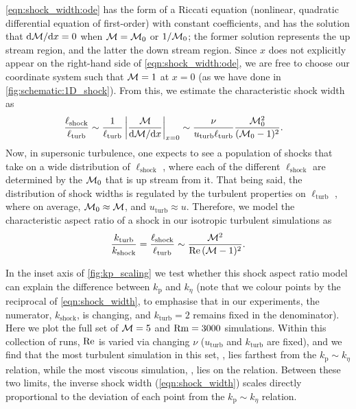 \autoref{eqn:shock_width:ode} has the form of a Riccati equation (nonlinear, quadratic differential equation of first-order) with constant coefficients, and has the solution that $\mathrm{d} \mathcal{M}/\mathrm{d} x = 0$ when $\mathcal{M} = \mathcal{M}_0$ or $1/\mathcal{M}_0$; the former solution represents the up stream region, and the latter the down stream region. Since $x$ does not explicitly appear on the right-hand side of \autoref{eqn:shock_width:ode}, we are free to choose our coordinate system such that $\mathcal{M} = 1$ at $x=0$ (as we have done in \autoref{fig:schematic:1D_shock}). From this, we estimate the characteristic shock width as
\begin{align}
    \frac{\ell_\mathrm{shock}}{\ell_\mathrm{turb}}
        &\sim \frac{1}{\ell_\mathrm{turb}} \left|
                \frac{\mathcal{M}}{\mathrm{d} \mathcal{M}/\mathrm{d} x}
            \right|_{x=0}
        \sim \frac{\nu}{u_\mathrm{turb} \ell_\mathrm{turb}} \frac{\mathcal{M}_0^2}{(\mathcal{M}_0 - 1)^2}
    .
\end{align}
Now, in supersonic turbulence, one expects to see a population of shocks that take on a wide distribution of $\ell_\mathrm{shock}$ \citep[\eg][]{smith2000distribution, brunt2002interstellar, donzis2012shock, lesaffre2013low, squire2017distribution, Park2019_pops_MHD_shocks, Beattie2020_ansotropic_shocks, Beattie2022_spdf}, where each of the different $\ell_\mathrm{shock}$ are determined by the $\mathcal{M}_0$ that is up stream from it. That being said, the distribution of shock widths is regulated by the turbulent properties on $\ell_\mathrm{turb}$ \citep{Park2019_pops_MHD_shocks}, where on average, \mbox{$\mathcal{M}_0 \approx \mathcal{M}$}, and \mbox{$u_\mathrm{turb} \approx u$}. Therefore, we model the characteristic aspect ratio of a shock in our isotropic turbulent simulations as
\begin{align}
    \frac{k_\mathrm{turb}}{k_\mathrm{shock}}
        = \frac{\ell_\mathrm{shock}}{\ell_\mathrm{turb}}
        \sim \frac{\mathcal{M}^2}{\mathrm{Re}\, (\mathcal{M} - 1)^2}
    . \label{eqn:shock_width}
\end{align}

In the inset axis of \autoref{fig:kp_scaling} we test whether this shock aspect ratio model can explain the difference between $k_\mathrm{p}$ and $k_\eta$ (note that we colour points by the reciprocal of \autoref{eqn:shock_width}, to emphasise that in our experiments, the numerator, $k_\mathrm{shock}$, is changing, and $k_\mathrm{turb} = 2$ remains fixed in the denominator). Here we plot the full set of $\mathcal{M} = 5$ and $\mathrm{Rm} = 3000$ simulations. Within this collection of runs, $\mathrm{Re}$ is varied via changing $\nu$ (\ie $u_\mathrm{turb}$ and $k_\mathrm{turb}$ are fixed), and we find that the most turbulent simulation in this set, , lies farthest from the $k_\mathrm{p} \sim k_\eta$ relation, while the most viscous simulation, , lies on the relation. Between these two limits, the inverse shock width (\autoref{eqn:shock_width}) scales directly proportional to the deviation of each point from the $k_\mathrm{p} \sim k_\eta$ relation.

